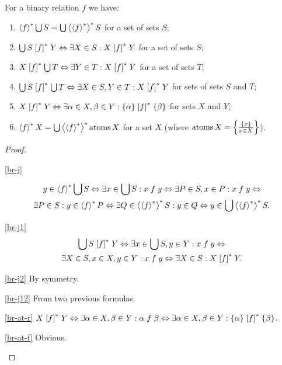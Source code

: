 \begin{prop}
For a binary relation $f$ we have:
\begin{enumerate}
\item \label{br-j}$\left\langle f\right\rangle ^{\ast}\bigcup S=\bigcup\left\langle \left\langle f\right\rangle ^{\ast}\right\rangle ^{\ast}S$ for
a set of sets $S$;
\item \label{br-j1}$\bigcup S\mathrel{\left[f\right]^{\ast}}Y\Leftrightarrow\exists X\in S:X\mathrel{\left[f\right]^{\ast}}Y$
for a set of sets $S$;
\item \label{br-j2}$X\mathrel{\left[f\right]^{\ast}}\bigcup T\Leftrightarrow\exists Y\in T:X\mathrel{\left[f\right]^{\ast}}Y$
for a set of sets $T$;
\item \label{br-j12}$\bigcup S\mathrel{\left[f\right]^{\ast}}\bigcup T\Leftrightarrow\exists X\in S,Y\in T:X\mathrel{\left[f\right]^{\ast}}Y$
for sets of sets $S$ and $T$;
\item \label{br-at-r}$X\mathrel{\left[f\right]^{\ast}}Y\Leftrightarrow\exists\alpha\in X,\beta\in Y:\{\alpha\}\mathrel{\left[f\right]^{\ast}}\{\beta\}$
for sets $X$ and $Y$;
\item \label{br-at-f}$\left\langle f\right\rangle ^{\ast}X=\bigcup\left\langle \left\langle f\right\rangle ^{\ast}\right\rangle ^{\ast}\operatorname{atoms} X$ for a
set $X$ (where $\operatorname{atoms} X=\left\{ \frac{\{x\}}{x\in X}\right\}$).
\end{enumerate}
\end{prop}
\begin{proof}
~
\begin{widedisorder}
\item [{\ref{br-j}}] ~

\begin{multline*}
y\in\left\langle f\right\rangle ^{\ast}\bigcup S\Leftrightarrow\exists x\in\bigcup S:x\mathrel fy\Leftrightarrow\exists P\in S,x\in P:x\mathrel fy\Leftrightarrow\\
\exists P\in S:y\in\left\langle f\right\rangle ^{\ast}P\Leftrightarrow\exists Q\in\left\langle \left\langle f\right\rangle ^{\ast}\right\rangle ^{\ast}S:y\in Q\Leftrightarrow y\in\bigcup\left\langle \left\langle f\right\rangle ^{\ast}\right\rangle ^{\ast}S.
\end{multline*}

\item [{\ref{br-j1}}] 
\begin{multline*}
\bigcup S\mathrel{\left[f\right]^{\ast}}Y\Leftrightarrow\exists x\in\bigcup S,y\in Y:x\mathrel fy\Leftrightarrow\\
\exists X\in S,x\in X,y\in Y:x\mathrel fy\Leftrightarrow\exists X\in S:X\mathrel{\left[f\right]^{\ast}}Y.
\end{multline*}

\item [{\ref{br-j2}}] By symmetry.
\item [{\ref{br-j12}}] From two previous formulas.
\item [{\ref{br-at-r}}] $X\mathrel{\left[f\right]^{\ast}}Y\Leftrightarrow\exists\alpha\in X,\beta\in Y:\alpha\mathrel f\beta\Leftrightarrow\exists\alpha\in X,\beta\in Y:\{\alpha\}\mathrel{\left[f\right]^{\ast}}\{\beta\}$.
\item [\ref{br-at-f}] Obvious.
\end{widedisorder}
\end{proof}
